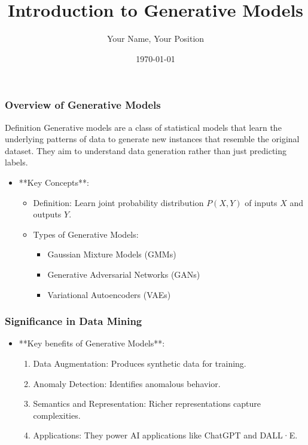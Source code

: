 \documentclass[aspectratio=169]{beamer}
\begin{document}
\frame{\titlepage}

\begin{frame}[fragile]
    \title{Introduction to Generative Models}
    \author{Your Name, Your Position}
    \date{\today}
    \maketitle
\end{frame}

\begin{frame}[fragile]
    \frametitle{Overview of Generative Models}
    \begin{block}{Definition}
        Generative models are a class of statistical models that learn the underlying patterns of data to generate new instances that resemble the original dataset. They aim to understand data generation rather than just predicting labels.
    \end{block}
    
    \begin{itemize}
        \item **Key Concepts**:
        \begin{itemize}
            \item Definition: Learn joint probability distribution \( P(X, Y) \) of inputs \( X \) and outputs \( Y \).
            \item Types of Generative Models:
            \begin{itemize}
                \item Gaussian Mixture Models (GMMs)
                \item Generative Adversarial Networks (GANs)
                \item Variational Autoencoders (VAEs)
            \end{itemize}
        \end{itemize}
    \end{itemize}
\end{frame}

\begin{frame}[fragile]
    \frametitle{Significance in Data Mining}
    \begin{itemize}
        \item **Key benefits of Generative Models**:
        \begin{enumerate}
            \item Data Augmentation: Produces synthetic data for training.
            \item Anomaly Detection: Identifies anomalous behavior.
            \item Semantics and Representation: Richer representations capture complexities.
            \item Applications: They power AI applications like ChatGPT and DALL·E.
        \end{enumerate}
    \end{itemize}
\end{frame}
\end{document}
